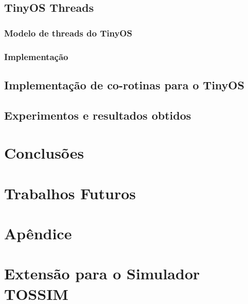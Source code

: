 \documentclass[a4paper, 10pt]{article}
\begin{document}
\subsection{TinyOS Threads} \label{TOSThreads}
\subsubsection{Modelo de threads do TinyOS}


\subsubsection{Implementação}


\subsection{Implementação de co-rotinas para o TinyOS}


\subsection{Experimentos e resultados obtidos}


\section{Conclusões}\label{conclusoes}



\section{Trabalhos Futuros}


\section{Apêndice}
\appendix
\section{Extensão para o Simulador TOSSIM}
\label{a:escalonador-tossim}
\end{document}

